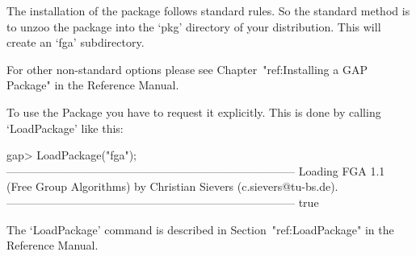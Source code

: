 

\null

The installation of the {\FGA} package follows standard {\GAP} rules.
So the standard method is to unzoo the package into the `pkg'
directory  of your {\GAP} distribution.  This will create an `fga'
subdirectory. 

For other non-standard options please see Chapter~"ref:Installing a
GAP Package" in the {\GAP} Reference Manual.


\null

To use the {\FGA} Package you have to request it explicitly. This  is
done by calling `LoadPackage' like this:

\beginexample
gap> LoadPackage("fga");
-----------------------------------------------------------------------------
Loading  FGA 1.1 (Free Group Algorithms)
by Christian Sievers (c.sievers@tu-bs.de).
-----------------------------------------------------------------------------
true
\endexample

The `LoadPackage' command is described in Section~"ref:LoadPackage"
in the {\GAP} Reference Manual.

